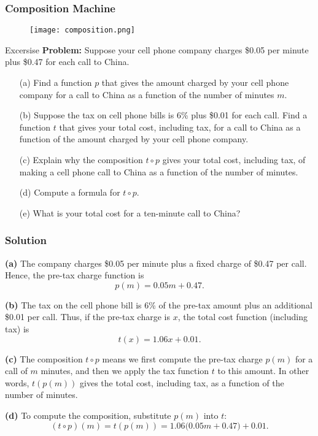 \begin{frame}
  \frametitle{Composition Machine}
\begin{figure}
  \centering 
  \texttt{[image: composition.png]}
\end{figure}
\end{frame}
\begin{frame}{Excersise}
  \textbf{Problem:} Suppose your cell phone company charges \$0.05 per minute plus \$0.47 for each call to China.
  \begin{enumerate}
    \item[(a)] Find a function \(p\) that gives the amount charged by your cell phone company for a call to China as a function of the number of minutes \(m\).
    \item[(b)] Suppose the tax on cell phone bills is 6\% plus \$0.01 for each call. Find a function \(t\) that gives your total cost, including tax, for a call to China as a function of the amount charged by your cell phone company.
    \item[(c)] Explain why the composition \(t \circ p\) gives your total cost, including tax, of making a cell phone call to China as a function of the number of minutes.
    \item[(d)] Compute a formula for \(t \circ p\).
    \item[(e)] What is your total cost for a ten-minute call to China?
  \end{enumerate}
  \end{frame} 
  \begin{frame}
    \frametitle{Solution}
    
    \textbf{(a)} The company charges \$0.05 per minute plus a fixed charge of \$0.47 per call. Hence, the pre-tax charge function is
    \[
    p(m)=0.05m+0.47.
    \]
    
    \textbf{(b)} The tax on the cell phone bill is 6\% of the pre-tax amount plus an additional \$0.01 per call. Thus, if the pre-tax charge is \(x\), the total cost function (including tax) is
    \[
    t(x)=1.06x+0.01.
    \]
    
    \textbf{(c)} The composition \(t \circ p\) means we first compute the pre-tax charge \(p(m)\) for a call of \(m\) minutes, and then we apply the tax function \(t\) to this amount. In other words, \(t(p(m))\) gives the total cost, including tax, as a function of the number of minutes.
    
    
    \textbf{(d)} To compute the composition, substitute \(p(m)\) into \(t\):
    \[
    (t \circ p)(m)=t(p(m))=1.06\bigl(0.05m+0.47\bigr)+0.01.
    \]
  \end{frame}

